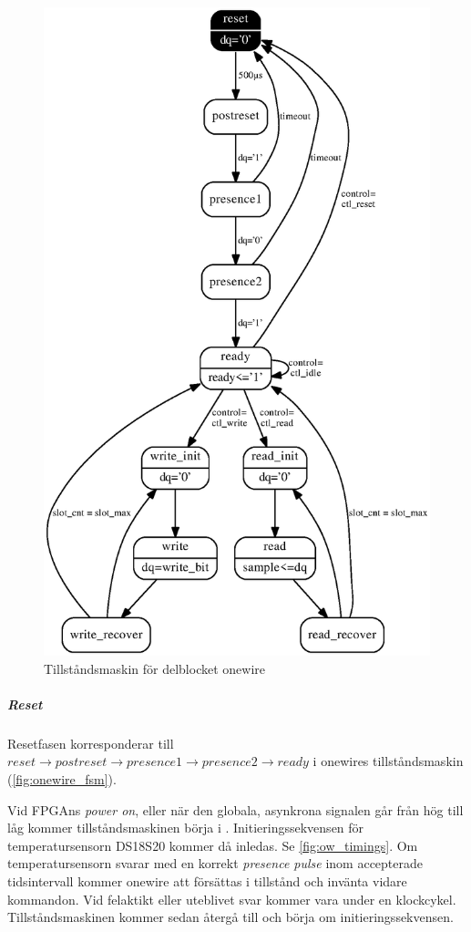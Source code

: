 \begin{figure}[H]
\centering
\includegraphics[height=0.97\textheight]{onewire_fsm.eps}
\caption{Tillståndsmaskin för delblocket onewire}
\label{fig:onewire_fsm}
\end{figure}


\subparagraph{Reset}
Resetfasen korresponderar till $reset\rightarrow postreset\rightarrow presence1\rightarrow presence2\rightarrow ready$ i onewires tillståndsmaskin (\autoref{fig:onewire_fsm}).

Vid FPGAns \emph{power on}, eller när den globala, asynkrona  signalen går från hög till låg kommer tillståndsmaskinen börja i . Initieringssekvensen för temperatursensorn DS18S20 kommer då inledas. Se \autoref{fig:ow_timings}. Om temperatursensorn svarar med en korrekt \emph{presence pulse} inom accepterade tidsintervall kommer onewire att försättas i tillstånd  och invänta vidare kommandon. Vid felaktikt eller uteblivet svar kommer  vara \high{} under en klockcykel. Tillståndsmaskinen kommer sedan återgå till  och börja om initieringssekvensen.

